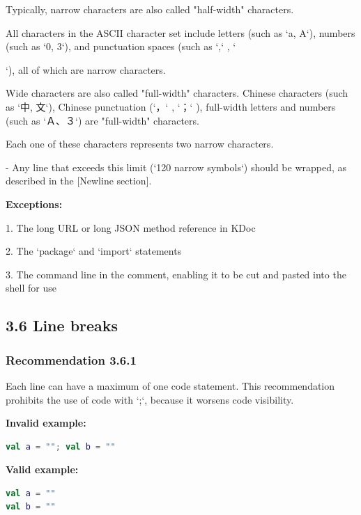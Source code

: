 Typically, narrow characters are also called "half-width" characters.

All characters in the ASCII character set include letters (such as `a, A`), numbers (such as `0, 3`), and punctuation spaces (such as `,` , `{`), all of which are narrow characters.

Wide characters are also called "full-width" characters. Chinese characters (such as `中, 文`), Chinese punctuation (`，` , `；` ), full-width letters and numbers (such as `Ａ、３`) are "full-width" characters.

Each one of these characters represents two narrow characters.



- Any line that exceeds this limit (`120 narrow symbols`) should be wrapped, as described in the [Newline section]. 



\textbf{Exceptions:}



1.	The long URL or long JSON method reference in KDoc

2.	The `package` and `import` statements

3.	The command line in the comment, enabling it to be cut and pasted into the shell for use



\subsection*{\textbf{3.6 Line breaks}}

\subsubsection*{\textbf{Recommendation 3.6.1}}
\leavevmode\newline

Each line can have a maximum of one code statement. This recommendation prohibits the use of code with `;`, because it worsens code visibility.



\textbf{Invalid example:}

\begin{lstlisting}[language=Kotlin]
val a = ""; val b = ""
\end{lstlisting}


\textbf{Valid example:}

\begin{lstlisting}[language=Kotlin]
val a = ""
val b = ""
\end{lstlisting}


}
